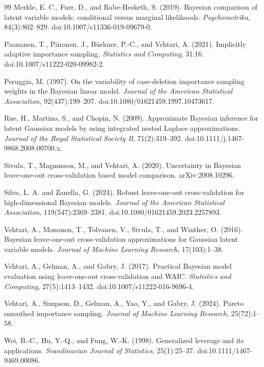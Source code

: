 \documentclass[11pt]{article}
\begin{document}
\begin{thebibliography}{99}
Merkle, E. C., Furr, D., and Rabe-Hesketh, S. (2019).
\newblock Bayesian comparison of latent variable models: conditional versus
marginal likelihoods.
\newblock \emph{Psychometrika}, 84(3):802--829. doi:10.1007/s11336-019-09679-0.

Paananen, T., Piironen, J., Bürkner, P.-C., and Vehtari, A. (2021).
\newblock Implicitly adaptive importance sampling.
\newblock \emph{Statistics and Computing}, 31:16. doi:10.1007/s11222-020-09982-2.

Peruggia, M. (1997).
\newblock On the variability of case-deletion importance sampling weights in the
Bayesian linear model.
\newblock \emph{Journal of the American Statistical Association}, 92(437):199--207.
doi:10.1080/01621459.1997.10473617.

Rue, H., Martino, S., and Chopin, N. (2009).
\newblock Approximate Bayesian inference for latent Gaussian models by using
integrated nested Laplace approximations.
\newblock \emph{Journal of the Royal Statistical Society B}, 71(2):319--392.
doi:10.1111/j.1467-9868.2008.00700.x.

Sivula, T., Magnusson, M., and Vehtari, A. (2020).
\newblock Uncertainty in Bayesian leave-one-out cross-validation based model
comparison.
\newblock arXiv:2008.10296.

Silva, L. A. and Zanella, G. (2024).
\newblock Robust leave-one-out cross-validation for high-dimensional Bayesian
models.
\newblock \emph{Journal of the American Statistical Association}, 119(547):2369--2381.
doi:10.1080/01621459.2023.2257893.

Vehtari, A., Mononen, T., Tolvanen, V., Sivula, T., and Winther, O. (2016).
\newblock Bayesian leave-one-out cross-validation approximations for Gaussian
latent variable models.
\newblock \emph{Journal of Machine Learning Research}, 17(103):1--38.

Vehtari, A., Gelman, A., and Gabry, J. (2017).
\newblock Practical Bayesian model evaluation using leave-one-out cross-validation
and WAIC.
\newblock \emph{Statistics and Computing}, 27(5):1413--1432.
doi:10.1007/s11222-016-9696-4.

Vehtari, A., Simpson, D., Gelman, A., Yao, Y., and Gabry, J. (2024).
\newblock Pareto smoothed importance sampling.
\newblock \emph{Journal of Machine Learning Research}, 25(72):1--58.

Wei, B.-C., Hu, Y.-Q., and Fung, W.-K. (1998).
\newblock Generalized leverage and its applications.
\newblock \emph{Scandinavian Journal of Statistics}, 25(1):25--37.
doi:10.1111/1467-9469.00086.

\end{thebibliography}
\end{document}
